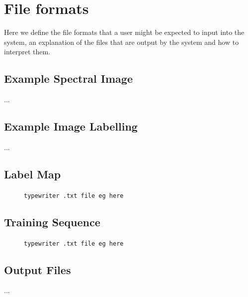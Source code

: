 \documentclass[12pt,twoside,notitlepage]{report}
\begin{document}
\appendix


\cleardoublepage
\chapter{File formats}    \label{app:file_formats}
    Here we define the file formats that a user might be expected to input into the system, an explanation of the 
    files that are output by the system and how to interpret them.

    \section{Example Spectral Image}
        ...


    \section{Example Image Labelling}
        ...
    
    \section{Label Map}
        \begin{figure}[H]
            \begin{framed}
                {\tt typewriter .txt file eg here }
            \end{framed}
        \end{figure}

    \section{Training Sequence}
        \begin{figure}[H]
            \begin{framed}
                {\tt typewriter .txt file eg here }
            \end{framed}
        \end{figure}

    \section{Output Files}
        ...
\end{document}
